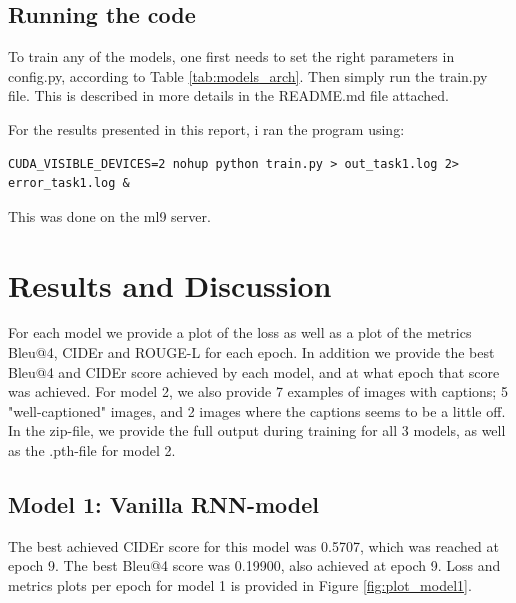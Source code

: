 \subsection*{Running the code}

To train any of the models, one first needs to set the right parameters in config.py, according to Table \ref{tab:models_arch}.
Then simply run the train.py file.
This is described in more details in the README.md file attached.

For the results presented in this report, i ran the program using:
\begin{verbatim}
CUDA_VISIBLE_DEVICES=2 nohup python train.py > out_task1.log 2> error_task1.log &
\end{verbatim}
This was done on the ml9 server.

\section*{Results and Discussion}

For each model we provide a plot of the loss as well as a plot of the metrics Bleu@4, CIDEr and ROUGE-L for each epoch.
In addition we provide the best Bleu@4 and CIDEr score achieved by each model, and at what epoch that score was achieved.
For model 2, we also provide 7 examples of images with captions; 5 "well-captioned" images, and 2 images where the captions seems to be a little off.
In the zip-file, we provide the full output during training for all 3 models, as well as the .pth-file for model 2.

\subsection*{Model 1: Vanilla RNN-model}

The best achieved CIDEr score for this model was 0.5707, which was reached at epoch 9.
The best Bleu@4 score was 0.19900, also achieved at epoch 9.
Loss and metrics plots per epoch for model 1 is provided in Figure \ref{fig:plot_model1}.


